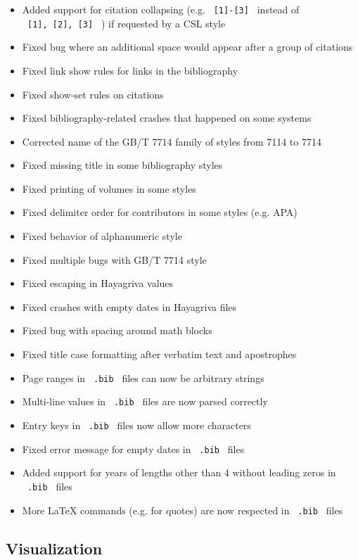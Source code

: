 \begin{itemize}
\tightlist
\item
  Added support for citation collapsing (e.g.
  \texttt{\ {[}1{]}-{[}3{]}\ } instead of
  \texttt{\ {[}1{]},\ {[}2{]},\ {[}3{]}\ } ) if requested by a CSL style
\item
  Fixed bug where an additional space would appear after a group of
  citations
\item
  Fixed link show rules for links in the bibliography
\item
  Fixed show-set rules on citations
\item
  Fixed bibliography-related crashes that happened on some systems
\item
  Corrected name of the GB/T 7714 family of styles from 7114 to 7714
\item
  Fixed missing title in some bibliography styles
\item
  Fixed printing of volumes in some styles
\item
  Fixed delimiter order for contributors in some styles (e.g. APA)
\item
  Fixed behavior of alphanumeric style
\item
  Fixed multiple bugs with GB/T 7714 style
\item
  Fixed escaping in Hayagriva values
\item
  Fixed crashes with empty dates in Hayagriva files
\item
  Fixed bug with spacing around math blocks
\item
  Fixed title case formatting after verbatim text and apostrophes
\item
  Page ranges in \texttt{\ .bib\ } files can now be arbitrary strings
\item
  Multi-line values in \texttt{\ .bib\ } files are now parsed correctly
\item
  Entry keys in \texttt{\ .bib\ } files now allow more characters
\item
  Fixed error message for empty dates in \texttt{\ .bib\ } files
\item
  Added support for years of lengths other than 4 without leading zeros
  in \texttt{\ .bib\ } files
\item
  More LaTeX commands (e.g. for quotes) are now respected in
  \texttt{\ .bib\ } files
\end{itemize}

\subsection{Visualization}\label{visualization}

